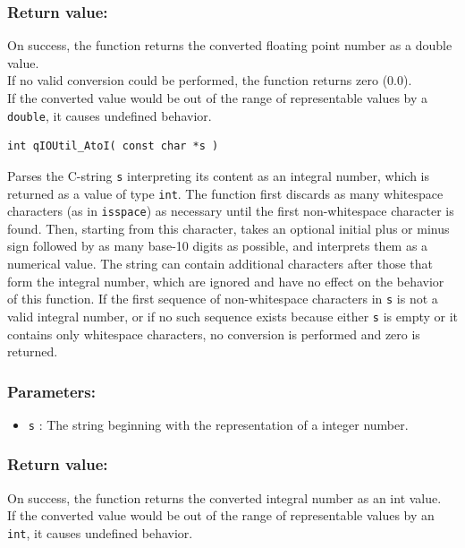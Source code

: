 \documentclass{article}
\begin{document}
\subsubsection*{Return value:}
On success, the function returns the converted floating point number as  a double value. \\
If no valid conversion could be performed, the function returns zero (0.0). \\
If the converted value would be out of the range of representable values by a \lstinline{double}, it causes undefined behavior.


\noindent\hrulefill

\begin{lstlisting}[style=CStyle]
int qIOUtil_AtoI( const char *s )
\end{lstlisting}

Parses the C-string \lstinline{s} interpreting its content as an integral number, which is returned as a value of type \lstinline{int}. The function first discards as many whitespace characters (as in \lstinline{isspace}) as necessary until the first non-whitespace character is found. Then, starting from this character, takes an optional initial plus or minus sign followed by as many base-10 digits as possible, and interprets them as a numerical value. 
The string can contain additional characters after those that form the integral number, which are ignored and have no effect on the behavior of this function. If the first sequence of non-whitespace characters in \lstinline{s} is not a valid integral number, or if no such sequence exists because either \lstinline{s} is empty or it contains only whitespace characters, no conversion is performed and zero is returned.

\subsubsection*{Parameters:}
\begin{itemize}
    \item \lstinline{s} : The string beginning with the representation of a integer number.

\end{itemize}

\subsubsection*{Return value:}
On success, the function returns the converted integral number as an int value. \\
If the converted value would be out of the range of representable values by an \lstinline{int}, it causes undefined behavior.
\end{document}
